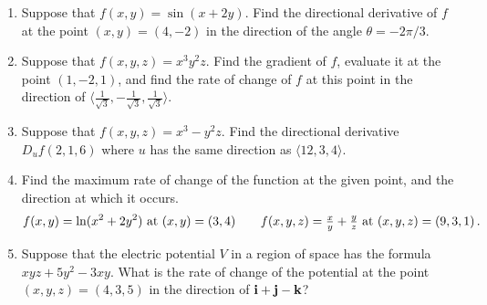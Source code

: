 \documentclass[12pt]{article}
\newcommand{\bfi}{{\bf i}}    %
\newcommand{\bfj}{{\bf j}}    %
\newcommand{\bfk}{{\bf k}}    %
\begin{document}
\begin{enumerate}
\item Suppose that $f(x,y)=\sin(x+2y)$.
  Find the directional derivative of $f$ at the point $(x,y)=(4,-2)$ in the direction of the angle $\theta=-2\pi/3$.\vspace{-2pt}

 
\item Suppose that $f(x,y,z)=x^3 y^2 z$.
  Find the gradient of $f$, evaluate it at the point $(1,-2,1)$, and find the rate of change of $f$ at this point
  in the direction of $\langle \frac{1}{\sqrt{3}},- \frac{1}{\sqrt{3}}, \frac{1}{\sqrt{3}}\rangle$.\vspace{-2pt}

\item Suppose that $f(x,y,z)=x^3-y^2z$.
  Find the directional derivative $D_uf(2,1,6)$ where $u$ has the same direction as $\langle 12,3,4\rangle$.\vspace{-2pt}
  
\item  Find the maximum rate of change of the function at the given point, and the direction at which it occurs.\vspace{-2pt}
  \[
  f(x,y)=\ln(x^2+2y^2)\ \mbox{at }(x,y)=(3,4) \qquad
  f(x,y,z)=\tfrac{x}{y} +\tfrac{y}{z}\ \mbox{at }(x,y,z)=(9,3,1)\,.\vspace{-2pt}
 \]

     
\item Suppose that the electric potential $V$ in a region of space has the formula $xyz + 5y^2 - 3xy$.
  What is the rate of change of the potential at the point $(x,y,z)=(4,3,5)$ in the direction of $\bfi+\bfj-\bfk$?\vspace{-2pt}


\end{enumerate}
\end{document}
